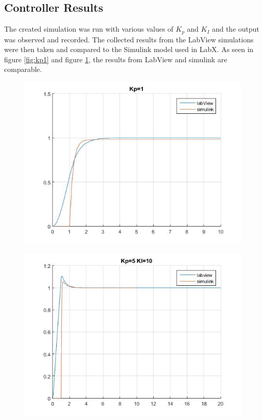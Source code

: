 \documentclass[11pt,titlepage]{article}
\begin{document}
	\subsection{Controller Results}
		The created simulation was run with various values of $K_p$ and $K_I$ and the output was observed and recorded. The collected results from the LabView simulations were then taken and compared to the Simulink model used in LabX. As seen in figure \ref{fig:kp1} and figure \ref{fig:kp5KI10}, the results from LabView and simulink are comparable.
		\begin{figure}[h!]
			\centering
			\begin{minipage}{.5\textwidth}
				\centering
				\includegraphics[scale=.4]{Kp1}
				\label{fig:kp1}
			\end{minipage}%
			\begin{minipage}{.5\textwidth}
				\centering
				\includegraphics[scale=.4]{Kp5KI10}
				\label{fig:kp5KI10}
			\end{minipage}%
		\end{figure}	
\end{document}
